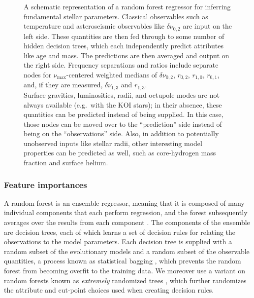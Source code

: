 \documentclass[manuscript]{aastex}
\begin{document}
\begin{figure}
    \centering
    
    \caption{A schematic representation of a random forest regressor for inferring fundamental stellar parameters. Classical observables such as temperature and asteroseismic observables like $\delta\nu_{0,2}$ are input on the left side. These quantities are then fed through to some number of hidden decision trees, which each independently predict attributes like age and mass. The predictions are then averaged and output on the right side. Frequency separations and ratios include separate nodes for $\nu_{\max}$-centered weighted medians of $\delta\nu_{0,2}$, $r_{0,2}$, $r_{1,0}$, $r_{0,1}$, and, if they are measured, $\delta\nu_{1,3}$ and $r_{1,3}$.\\
    Surface gravities, luminosities, radii, and octupole modes are not always available (e.g.~with the KOI stars); in their absence, these quantities can be predicted instead of being supplied. In this case, those nodes can be moved over to the ``prediction'' side instead of being on the ``observations'' side. Also, in addition to potentially unobserved inputs like stellar radii, other interesting model properties can be predicted as well, such as core-hydrogen mass fraction and surface helium. }
    \label{fig:rf}
\end{figure}


\subsubsection{Feature importances}
\label{sec:importances}
A random forest is an ensemble regressor, meaning that it is composed of many individual components that each perform regression, and the forest subsequently averages over the results from each component \citep{breiman2001random}. The components of the ensemble are decision trees, each of which learns a set of decision rules for relating the observations to the model parameters. Each decision tree is supplied with a random subset of the evolutionary models and a random subset of the observable quantities, a process known as statistical bagging \citep[see section 8.7 of][]{hastie2005elements}, which prevents the random forest from becoming overfit to the training data. We moreover use a variant on random forests known as \emph{extremely} randomized trees \citep{geurts2006extremely}, which further randomizes the attribute and cut-point choices used when creating decision rules. 
\end{document}
